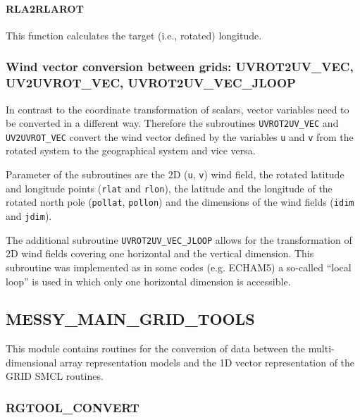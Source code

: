 \documentclass[11pt,twoside]{article}
\begin{document}
\paragraph{RLA2RLAROT\\\label{L2LR}}
This function calculates the target (i.e., rotated) longitude.

\subsubsection{Wind vector conversion between grids:
UVROT2UV\_VEC, UV2UVROT\_VEC, UVROT2UV\_VEC\_JLOOP \label{windconv}}
In contrast to the coordinate transformation of scalars, vector
variables need to be converted in a different way. 
Therefore the subroutines \verb|UVROT2UV_VEC| and \verb|UV2UVROT_VEC|
convert the wind vector defined by the variables \verb|u| and \verb|v| from
the rotated system to the geographical system and vice versa. 

Parameter of the subroutines are the 2D (\verb|u|, \verb|v|) wind
field, the rotated latitude and longitude points (\verb|rlat|
and \verb|rlon|), the latitude and the longitude of the rotated north pole
(\verb|pollat|, \verb|pollon|) and the dimensions of the wind fields
(\verb|idim| and \verb|jdim|).

The additional subroutine \verb|UVROT2UV_VEC_JLOOP| allows for the 
transformation of 2D wind fields covering one horizontal and the vertical
dimension.
This subroutine was implemented as in some codes (e.g. ECHAM5) a so-called
``local loop'' is used in which only one horizontal dimension is accessible.
\clearpage
\subsection{MESSY\_MAIN\_GRID\_TOOLS\label{MMGTO}}
This module contains routines for the conversion of data between the
multi-dimensional array representation models and the 1D vector representation
of the GRID SMCL routines. 

\subsubsection{RGTOOL\_CONVERT\label{RGTCONV}}
\end{document}
